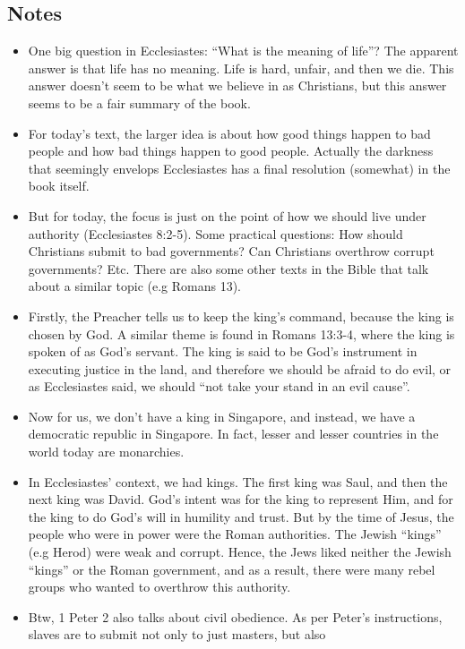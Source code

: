 \subsection*{Notes}
\begin{itemize}
  \item{One big question in Ecclesiastes: ``What is the meaning of life''?
  The apparent answer is that life has no meaning.  Life is hard, unfair, and
  then we die. This answer doesn't seem to be what we believe in as Christians, but this answer seems to be a fair summary of the book.}
  \item{For today's text, the larger idea is about how good things happen to
  bad people and how bad things happen to good people.  Actually the darkness
  that seemingly envelops Ecclesiastes has a final resolution (somewhat) in
  the book itself.}
  \item{But for today, the focus is just on the point of how we should live
  under authority (Ecclesiastes 8:2-5).  Some practical questions: How should
  Christians submit to bad governments?  Can Christians overthrow corrupt
  governments?  Etc. There are also some other texts in the Bible that talk about a similar topic (e.g Romans 13).}
  \item{Firstly, the Preacher tells us to keep the king's command, because
  the king is chosen by God.  A similar theme is found in Romans 13:3-4,
  where the king is spoken of as God's servant.  The king is said to be God's
  instrument in executing justice in the land, and therefore we should be
  afraid to do evil, or as Ecclesiastes said, we should ``not take your stand
  in an evil cause''.}
  \item{Now for us, we don't have a king in Singapore, and instead, we have a
  democratic republic in Singapore.  In fact, lesser and lesser countries in
  the world today are monarchies.}
  \item{In Ecclesiastes' context, we had kings.  The first king was Saul, and
  then the next king was David.  God's intent was for the king to represent
  Him, and for the king to do God's will in humility and trust.  But by the
  time of Jesus, the people who were in power were the Roman authorities.
  The Jewish ``kings'' (e.g Herod) were weak and corrupt.  Hence, the Jews
  liked neither the Jewish ``kings'' or the Roman government, and as a
  result, there were many rebel groups who wanted to overthrow this
  authority.} 
  \item{Btw, 1 Peter 2 also talks about civil obedience.  As per Peter's
  instructions, slaves are to submit not only to just masters, but also
}
\end{itemize}
